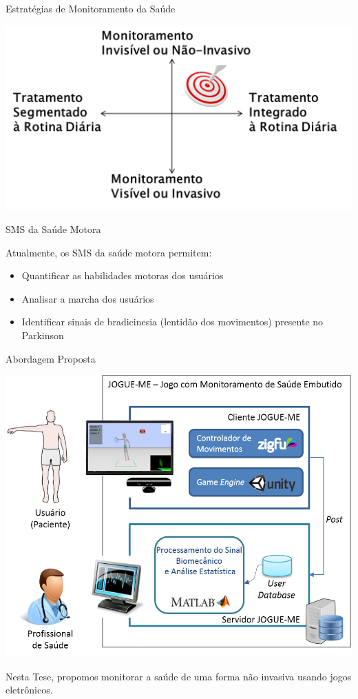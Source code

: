 \documentclass{beamer}
\begin{document}
\begin{frame}{Estratégias de Monitoramento da Saúde}
  \begin{block}{}
      \center \includegraphics[height=2.2 in]{img/estrategmonitorament.png}
  \end{block}
\end{frame}


\begin{frame}{SMS da Saúde Motora}  
  \begin{block}{}  
  Atualmente, os SMS da saúde motora permitem:  
    \begin{itemize}
    \item Quantificar as habilidades motoras dos usuários~\cite{manumeterjbhi2014,patel_monitoring_2009}
    \item Analisar a marcha dos usuários~\cite{robotgait2014}
    \item Identificar sinais de bradicinesia (lentidão dos movimentos) presente no Parkinson~\cite{ambulatoryparkinson2010}
    \end{itemize}   
  \end{block}   
\end{frame}

\begin{frame}{Abordagem Proposta}
  \begin{block}{}
      \center \includegraphics[height=1.8 in]{img/visaosistema.png}
  \end{block}
  \begin{block}{ }
Nesta Tese, propomos monitorar a saúde de uma forma não invasiva usando jogos eletrônicos. 
  \end{block}
\end{frame}
\end{document}
